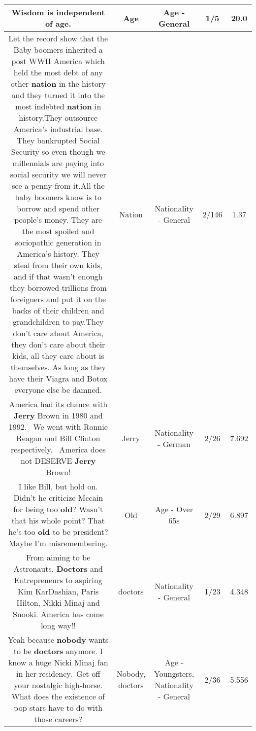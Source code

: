 \documentclass[11pt]{article}
\newlength\mylength
\begin{document}
\begin{center}
\begin{longtable}{|C{.65\mylength}|C{.30\mylength}|C{.12\mylength}|C{.12\mylength}|C{.12\mylength}|}
  \small Wisdom is independent of \textbf{age}.\normalsize   & Age & Age - General & 1/5 & 20.0 \\  \hline
  \small Let the record show that the Baby boomers inherited a post WWII America which held the most debt of any other \textbf{nation} in the history and they turned it into the most indebted \textbf{nation} in history.They outsource America's industrial base. They bankrupted Social Security so even though we millennials are paying into social security we will never see a penny from it.All the baby boomers know is to borrow and spend other people's money. They are the most spoiled and sociopathic generation in America's history. They steal from their own kids, and if that wasn't enough they borrowed trillions from foreigners and put it on the backs of their children and grandchildren to pay.They don't care about America, they don't care about their kids, all they care about is themselves. As long as they have their Viagra and Botox everyone else be damned.\normalsize   & Nation & Nationality - General & 2/146 & 1.37 \\  \hline
  \small America had its chance with \textbf{Jerry} Brown in 1980 and 1992.  We went with Ronnie Reagan and Bill Clinton respectively.  America does not DESERVE \textbf{Jerry} Brown!\normalsize   & Jerry & Nationality - German & 2/26 & 7.692 \\  \hline
  \small I like Bill, but hold on. Didn't he criticize Mccain for being too \textbf{old}? Wasn't that his whole point? That he's too \textbf{old} to be president?Maybe I'm misremembering.\normalsize   & Old & Age - Over 65s & 2/29 & 6.897 \\  \hline
  \small From aiming to be Astronauts, \textbf{Doctors} and Entrepreneurs to aspiring Kim KarDashian, Paris Hilton, Nikki Minaj and Snooki. America has come long way!!\normalsize   & doctors & Nationality - General & 1/23 & 4.348 \\  \hline
  \small Yeah because \textbf{nobody} wants to be \textbf{doctors} anymore. I know a huge Nicki Minaj fan in her residency. Get off your nostalgic high-horse. What does the existence of pop stars have to do with those careers?\normalsize   & Nobody, doctors & Age - Youngsters, Nationality - General & 2/36 & 5.556 \\  \hline

\end{longtable}
\end{center}
\end{document}
